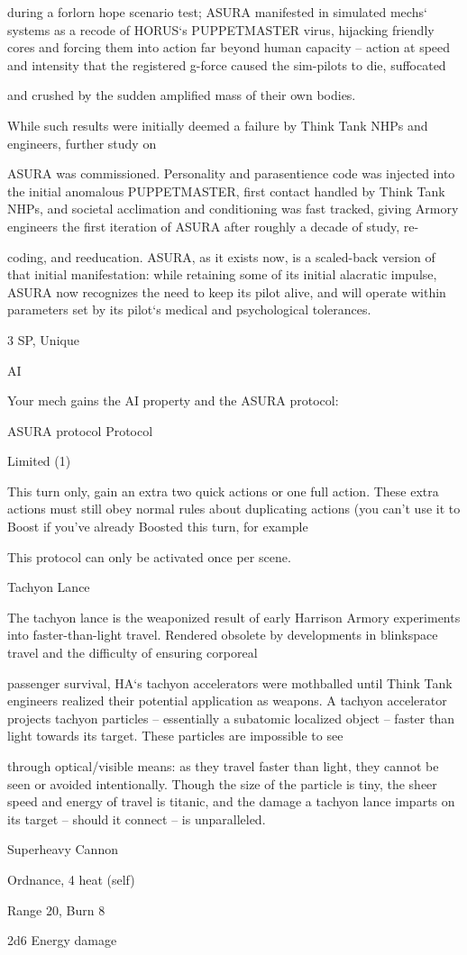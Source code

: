 during a forlorn hope scenario test; ASURA manifested in simulated mechs‘ systems as a recode of
HORUS‘s PUPPETMASTER virus, hijacking friendly cores and forcing them into action far beyond human
capacity -- action at speed and intensity that the registered g-force caused the sim-pilots to die, suffocated

and crushed by the sudden amplified mass of their own bodies.

While such results were initially deemed a failure by Think Tank NHPs and engineers, further study on

ASURA was commissioned. Personality and parasentience code was injected into the initial anomalous
PUPPETMASTER, first contact handled by Think Tank NHPs, and societal acclimation and conditioning
was fast tracked, giving Armory engineers the first iteration of ASURA after roughly a decade of study, re-

coding, and reeducation. ASURA, as it exists now, is a scaled-back version of that initial manifestation:
while retaining some of its initial alacratic impulse, ASURA now recognizes the need to keep its pilot alive,
and will operate within parameters set by its pilot‘s medical and psychological tolerances.

3 SP, Unique

AI

Your mech gains the AI property and the ASURA protocol:

         ASURA protocol
	        Protocol

         Limited (1)





         This turn only, gain an extra two quick actions or one full action. These extra actions must
         still obey normal rules about duplicating actions (you can’t use it to Boost if you’ve
         already Boosted this turn, for example

         This protocol can only be activated once per scene.


Tachyon Lance

The tachyon lance is the weaponized result of early Harrison Armory experiments into faster-than-light
travel. Rendered obsolete by developments in blinkspace travel and the difficulty of ensuring corporeal

passenger survival, HA‘s tachyon accelerators were mothballed until Think Tank engineers realized their
potential application as weapons. A tachyon accelerator projects tachyon particles -- essentially a
subatomic localized object -- faster than light towards its target. These particles are impossible to see

through optical/visible means: as they travel faster than light, they cannot be seen or avoided intentionally.
Though the size of the particle is tiny, the sheer speed and energy of travel is titanic, and the damage a
tachyon lance imparts on its target -- should it connect -- is unparalleled.

Superheavy Cannon

Ordnance, 4 heat (self)

Range 20, Burn 8

2d6 Energy damage

